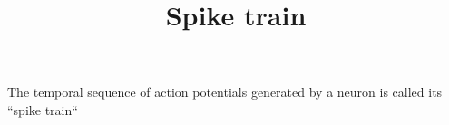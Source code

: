 \documentclass[a4paper]{article}
\title{Spike train}
\date{}
\begin{document}
    \maketitle
    The temporal sequence of action potentials generated by a neuron is called its ``spike train``
    \cite{vandrongelen-2007-spike-train-analysis}
    
    
\end{document}
